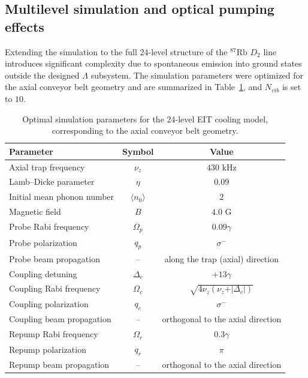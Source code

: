 \subsection{Multilevel simulation and optical pumping effects}
\label{subsec:results_multilevel}

Extending the simulation to the full 24-level structure of the $^{87}\mathrm{Rb}$ $D_2$ line introduces significant complexity due to spontaneous emission into ground states outside the designed $\Lambda$ subsystem. The simulation parameters were optimized for the axial conveyor belt geometry and are summarized in Table~\ref{tab:optimal_parameters}, and $N_{vib}$ is set to $10$.

\begin{table}[htbp]
\centering
\caption{Optimal simulation parameters for the 24-level EIT cooling model, corresponding to the axial conveyor belt geometry.}
\label{tab:optimal_parameters}
\begin{tabular}{lcc}
\hline
\textbf{Parameter} & \textbf{Symbol} & \textbf{Value} \\
\hline
Axial trap frequency & $\nu_z$ & $430$ kHz \\
Lamb--Dicke parameter & $\eta$ & $0.09$ \\
Initial mean phonon number & $\langle n_0 \rangle$ & $2$ \\
Magnetic field & $B$ & $4.0$ G \\
Probe Rabi frequency & $\Omega_p$ & $0.09\gamma$ \\
Probe polarization & $q_p$ & $\sigma^-$ \\
Probe beam propagation & -- & along the trap (axial) direction \\
Coupling detuning & $\Delta_c$ & $+13\gamma$ \\
Coupling Rabi frequency & $\Omega_c$ & $\sqrt{4\nu_z(\nu_z+\vert\Delta_c\vert)}$ \\
Coupling polarization & $q_c$ & $\sigma^-$ \\
Coupling beam propagation & -- & orthogonal to the axial direction \\
Repump Rabi frequency & $\Omega_r$ & $0.3\gamma$ \\
Repump polarization & $q_r$ & $\pi$ \\
Repump beam propagation & -- & orthogonal to the axial direction \\
\hline
\end{tabular}
\end{table}

